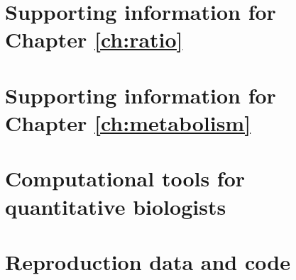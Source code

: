 \chapter{Supporting information for Chapter \ref{ch:ratio}}
\label{appendix:ratio}




\newpage

\chapter{Supporting information for Chapter \ref{ch:metabolism}}
\label{appendix:metabolism}



\newpage

\chapter{Computational tools for quantitative biologists}
\label{appendix:software}


\newpage

\chapter{Reproduction data and code}
\label{appendix:data}

